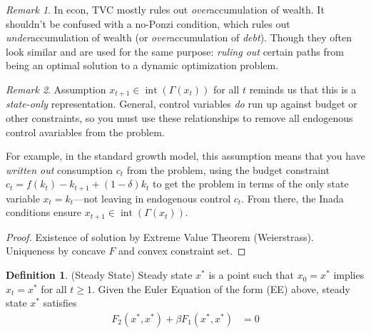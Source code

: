 \documentclass[12pt]{article}
\numberwithin{equation}{section} %
\theoremstyle{plain}
\theoremstyle{definition}
\newtheorem{defn}[thm]{Definition}
\theoremstyle{remark}
\newtheorem*{rmk}{Remark}
\newcommand{\interior}{\operatorname{int}}
\begin{document}
\begin{rmk}
In econ, TVC mostly rules out \emph{over}accumulation of wealth.
It shouldn't be confused with a no-Ponzi condition, which rules out
\emph{under}accumulation of wealth (or \emph{over}accumulation of
\emph{debt}). Though they often look similar and are used for the same
purpose: \emph{ruling out} certain paths from being an optimal solution
to a dynamic optimization problem.
\end{rmk}
\begin{rmk}
Assumption $x_{t+1}\in\interior(\Gamma(x_t))$ for all $t$
reminds us that this is a \emph{state-only} representation.
General, control variables \emph{do} run up against budget or other
constraints, so you must use these relationships to remove
all endogenous control avariables from the problem.

For example, in the standard growth model, this assumption
means that you have \emph{written out} consumption $c_t$ from the
problem, using the budget constraint $c_t = f(k_t) - k_{t+1} +
(1-\delta) k_t$ to get the problem in terms of the only state variable
$x_t=k_t$---not leaving in endogenous control $c_t$.  From there, the
Inada conditions ensure $x_{t+1}\in \interior(\Gamma(x_t))$.
\end{rmk}
\begin{proof}
Existence of solution by Extreme Value Theorem (Weierstrass). Uniqueness
by concave $F$ and convex constraint set.
\end{proof}

\begin{defn}(Steady State)
Steady state $x^*$ is a point such that $x_0=x^*$ implies $x_t=x^*$ for
all $t\geq 1$.
Given the Euler Equation of the form (EE) above, steady state $x^*$
satisfies
\begin{align*}
  F_2(x^*,x^*) + \beta F_1(x^*,x^*)
  &= 0
\end{align*}
\end{defn}
\end{document}
